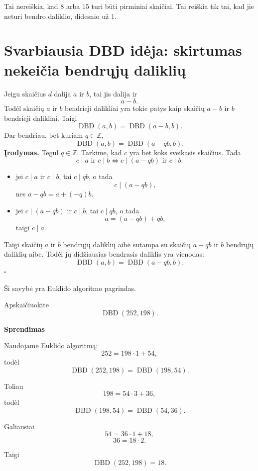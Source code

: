 \documentclass[11pt,a4paper]{scrartcl}
\newenvironment{solution}
    {\begin{list}{}{\setlength{\leftmargin}{10pt}\setlength{\rightmargin}{10pt}}\item[]}
    {\end{list}}
\begin{document}
Tai nereiškia, kad $8$ arba $15$ turi būti pirminiai skaičiai.
Tai reiškia tik tai, kad jie neturi bendro daliklio, didesnio už $1$.

\section{Svarbiausia DBD idėja: skirtumas nekeičia bendrųjų daliklių}

Jeigu skaičius $d$ dalija $a$ ir $b$, tai jis dalija ir
\[
a-b.
\]
Todėl skaičių $a$ ir $b$ bendrieji dalikliai yra tokie patys kaip skaičių
$a-b$ ir $b$ bendrieji dalikliai. Taigi
\[
\boxed{\operatorname{DBD}(a,b)=\operatorname{DBD}(a-b,b)}.
\]
Dar bendriau, bet kuriam $q\in\mathbb Z$,
\[
\boxed{\operatorname{DBD}(a,b)=\operatorname{DBD}(a-qb,b)}.
\]
\textbf{Įrodymas.} Tegul $q\in\mathbb Z$.
Tarkime, kad $c$ yra bet koks sveikasis skaičius. Tada
\[
 c\mid a \text{ ir } c\mid b
\Longleftrightarrow
 c\mid (a-qb) \text{ ir } c\mid b.
\]
\begin{itemize}
    \item jei $c\mid a$ ir $c\mid b$, tai $c\mid qb$, o tada
    \[
    c\mid (a-qb),
    \]
    nes $a-qb=a+(-q)b$.

    \item jei $c\mid (a-qb)$ ir $c\mid b$, tai $c\mid qb$, o tada
    \[
    a=(a-qb)+qb,
    \]
    taigi $c\mid a$.
\end{itemize}
Taigi skaičių $a$ ir $b$ bendrųjų daliklių aibė sutampa su skaičių $a-qb$ ir $b$ bendrųjų daliklių aibe. Todėl jų didžiausias bendrasis daliklis yra vienodas:
\[
\operatorname{DBD}(a,b)=\operatorname{DBD}(a-qb,b).
\]
\hfill $\square$

Ši savybė yra Euklido algoritmo pagrindas.

\begin{example}

Apskaičiuokite
\[
\operatorname{DBD}(252,198).
\]

\end{example}

\begin{solution}
\textbf{Sprendimas}

Naudojame Euklido algoritmą:
\[
252=198\cdot1+54,
\]
todėl
\[
\operatorname{DBD}(252,198)=\operatorname{DBD}(198,54).
\]

Toliau
\[
198=54\cdot3+36,
\]
todėl
\[
\operatorname{DBD}(198,54)=\operatorname{DBD}(54,36).
\]

Galiausiai
\[
54=36\cdot1+18,
\]
\[
36=18\cdot2.
\]

Taigi
\[
\boxed{\operatorname{DBD}(252,198)=18}.
\]

\end{solution}
\end{document}
